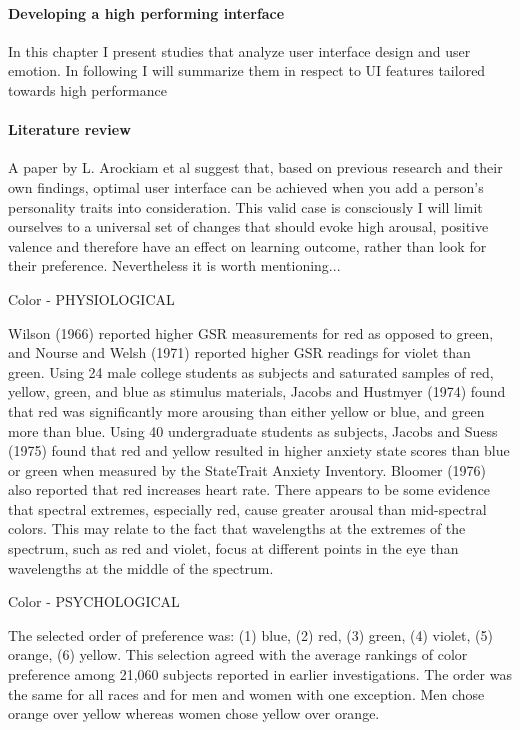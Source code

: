 \paragraph{Developing a high performing interface}

In this chapter I present studies that analyze user interface design and user emotion. In following I will summarize them in respect to UI features tailored towards high performance

\paragraph{Literature review}

A paper by L. Arockiam et al \cite{Arockiam2013} suggest that, based on previous research and their own findings, optimal user interface can be achieved when you add a person's personality traits into consideration. This valid case is consciously  I will limit ourselves to a universal set of changes that should evoke high arousal, positive valence and therefore have an effect on learning outcome, rather than look for their preference. Nevertheless it is worth mentioning...

Color - PHYSIOLOGICAL

Wilson (1966) reported higher GSR measurements for red as opposed to green, and Nourse and Welsh (1971) reported higher GSR readings for violet than green. Using 24 male college students as subjects and saturated samples of red, yellow, green, and blue as stimulus materials, Jacobs and Hustmyer (1974) found that red was significantly more arousing than either yellow or blue, and green more than blue. Using 40 undergraduate students as subjects, Jacobs and Suess (1975) found that red and yellow resulted in higher anxiety state scores than blue or green when measured by the StateTrait Anxiety Inventory. Bloomer (1976) also reported that red increases heart rate. There appears to be some evidence that spectral extremes, especially red, cause greater arousal than mid-spectral colors. This may relate to the fact that wavelengths at the extremes of the spectrum, such as red and violet, focus at different points in the eye than wavelengths at the middle of the spectrum. \cite{Pert1996}

Color - PSYCHOLOGICAL

The selected order of preference was: (1) blue, (2) red, (3) green, (4) violet, (5) orange, (6) yellow. This selection agreed with the average rankings of color preference among 21,060 subjects reported in earlier investigations. The order was the same for all races and for men and women with one exception. Men chose orange over yellow whereas women chose yellow over orange. \cite{Pert1996}

